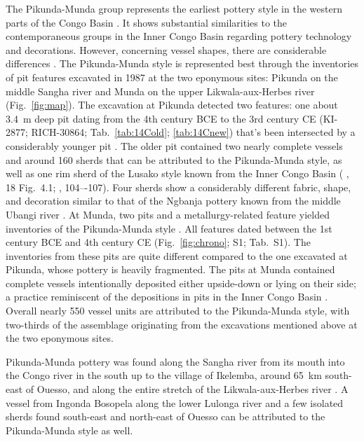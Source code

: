 \documentclass[smallextended,natbib]{svjour3}       %
\begin{document}
The Pikunda-Munda group represents the earliest pottery style in the western parts of the Congo Basin \citep[114--120]{Seidensticker.2021e}. It shows substantial similarities to the contemporaneous groups in the Inner Congo Basin regarding pottery technology and decorations. However, concerning vessel shapes, there are considerable differences \citep[107 Ftn.~4]{Wotzka.1995}. The Pikunda-Munda style is represented best through the inventories of pit features excavated in 1987 at the two eponymous sites: Pikunda on the middle Sangha river and Munda on the upper Likwala-aux-Herbes river (Fig.~\ref{fig:map}). The excavation at Pikunda detected two features: one about 3.4~m deep pit dating from the 4th century BCE to the 3rd century CE (KI-2877; RICH-30864; Tab.~\ref{tab:14Cold}; \ref{tab:14Cnew}) that's been intersected by a considerably younger pit \citep[288--300]{Seidensticker.2021e}. The older pit contained two nearly complete vessels and around 160 sherds that can be attributed to the Pikunda-Munda style, as well as one rim sherd of the Lusako style known from the Inner Congo Basin (\citeauthor{Eggert.1992} \citeyear{Eggert.1992}, 18 Fig.~4.1; \citeauthor{Wotzka.1995} \citeyear{Wotzka.1995}, 104–-107). Four sherds show a considerably different fabric, shape, and decoration similar to that of the Ngbanja pottery known from the middle Ubangi river \citep[296 Tab.~34]{Seidensticker.2021e}. At Munda, two pits and a metallurgy-related feature yielded inventories of the Pikunda-Munda style \citep[321--339]{Seidensticker.2021e}. All features dated between the 1st century BCE and 4th century CE (Fig.~\ref{fig:chrono}; S1; Tab.~S1). The inventories from these pits are quite different compared to the one excavated at Pikunda, whose pottery is heavily fragmented. The pits at Munda contained complete vessels intentionally deposited either upside-down or lying on their side; a practice reminiscent of the depositions in pits in the Inner Congo Basin \citep{Wotzka.1993}. Overall nearly 550 vessel units are attributed to the Pikunda-Munda style, with two-thirds of the assemblage originating from the excavations mentioned above at the two eponymous sites.

Pikunda-Munda pottery was found along the Sangha river from its mouth into the Congo river in the south up to the village of Ikelemba, around 65~km south-east of Ouesso, and along the entire stretch of the Likwala-aux-Herbes river \citep[Fig.~\ref{fig:timeslices_1_eia}B--D;][119 Fig.~49]{Seidensticker.2021e}. A vessel from Ingonda Bosopela along the lower Lulonga river \citep[119 Ftn. 4, 531 Pl. 97.5]{Wotzka.1995} and a few isolated sherds found south-east and north-east of Ouesso \citep[114 Fig.~42]{Gillet.2013} can be attributed to the Pikunda-Munda style as well.
\end{document}
